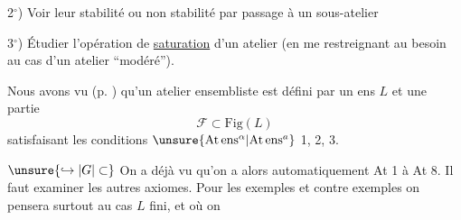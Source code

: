 2$^\circ$) Voir leur stabilité ou non stabilité par passage à un sous-atelier

3$^\circ$) Étudier l'opération de \uline{saturation} d'un atelier (en me restreignant au besoin au cas d'un atelier ``modéré'').

Nous avons vu (p. ) qu'un atelier ensembliste est défini par un ens $L$ et une partie 
\[
\mathcal F\subset\mathrm{Fig}(L)
\]
satisfaisant les conditions $\unsure{\mathrm{At}\,\mathrm{ens}^{\alpha}|\mathrm{At}\,\mathrm{ens}^{a}}$ 1, 2, 3.

$\unsure{\hookrightarrow|G|\subset}$ On a déjà vu qu'on a alors automatiquement At 1 à At 8. Il faut examiner les autres axiomes. Pour les exemples et contre exemples on pensera surtout au cas $L$ fini, et où on 

